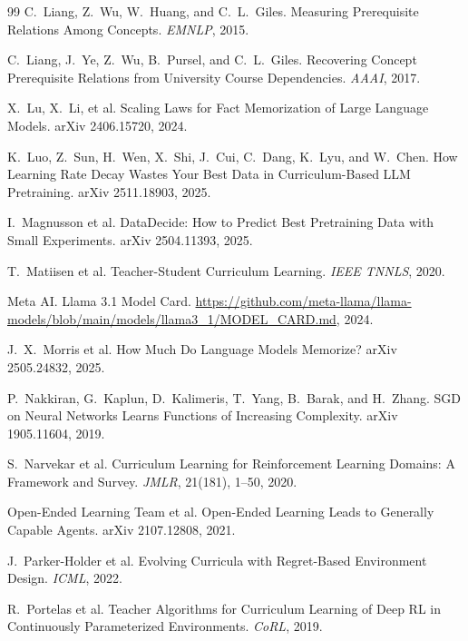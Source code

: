 \documentclass[11pt]{article}
\theoremstyle{plain}
\theoremstyle{definition}
\theoremstyle{remark}
\begin{document}
\begin{thebibliography}{99}
 C.~Liang, Z.~Wu, W.~Huang, and C.~L.~Giles.
Measuring Prerequisite Relations Among Concepts. \emph{EMNLP}, 2015.

 C.~Liang, J.~Ye, Z.~Wu, B.~Pursel, and
C.~L.~Giles. Recovering Concept Prerequisite Relations from University Course Dependencies.
\emph{AAAI}, 2017.

 X.~Lu, X.~Li, et al. Scaling Laws for Fact Memorization of Large
Language Models. arXiv 2406.15720, 2024.

 K.~Luo, Z.~Sun, H.~Wen, X.~Shi, J.~Cui, C.~Dang, K.~Lyu,
and W.~Chen. How Learning Rate Decay Wastes Your Best Data in Curriculum-Based LLM Pretraining.
arXiv 2511.18903, 2025.

 I.~Magnusson et al. DataDecide: How to
Predict Best Pretraining Data with Small Experiments. arXiv 2504.11393, 2025.

 T.~Matiisen et al. Teacher-Student Curriculum
Learning. \emph{IEEE TNNLS}, 2020.

 Meta AI. Llama 3.1 Model Card.
\url{https://github.com/meta-llama/llama-models/blob/main/models/llama3_1/MODEL_CARD.md}, 2024.

 J.~X.~Morris et al. How Much Do Language Models Memorize?
arXiv 2505.24832, 2025.

 P.~Nakkiran, G.~Kaplun, D.~Kalimeris, T.~Yang,
B.~Barak, and H.~Zhang. SGD on Neural Networks Learns Functions of Increasing Complexity.
arXiv 1905.11604, 2019.

 S.~Narvekar et al. Curriculum Learning for
Reinforcement Learning Domains: A Framework and Survey. \emph{JMLR}, 21(181), 1--50, 2020.

 Open-Ended Learning Team et al.
Open-Ended Learning Leads to Generally Capable Agents. arXiv 2107.12808, 2021.

 J.~Parker-Holder et al. Evolving
Curricula with Regret-Based Environment Design. \emph{ICML}, 2022.

 R.~Portelas et al. Teacher Algorithms for
Curriculum Learning of Deep RL in Continuously Parameterized Environments. \emph{CoRL}, 2019.


\end{thebibliography}
\end{document}
